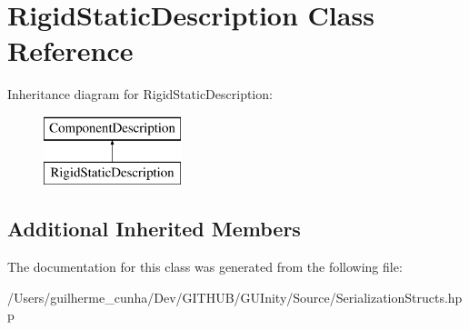 \hypertarget{class_rigid_static_description}{}\section{Rigid\+Static\+Description Class Reference}
\label{class_rigid_static_description}
Inheritance diagram for Rigid\+Static\+Description\+:\begin{figure}[H]
\begin{center}
\leavevmode
\includegraphics[height=2.000000cm]{class_rigid_static_description}
\end{center}
\end{figure}
\subsection*{Additional Inherited Members}


The documentation for this class was generated from the following file\+:\begin{DoxyCompactItemize}
\item 
/\+Users/guilherme\+\_\+cunha/\+Dev/\+G\+I\+T\+H\+U\+B/\+G\+U\+Inity/\+Source/Serialization\+Structs.\+hpp\end{DoxyCompactItemize}
